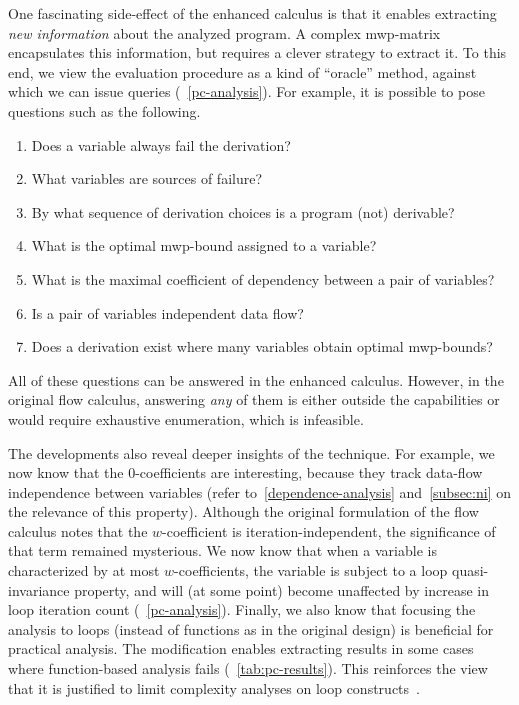 One fascinating side-effect of the enhanced calculus is that it enables extracting \emph{new information} about the analyzed program.
A complex mwp-matrix encapsulates this information, but requires a clever strategy to extract it.
To this end, we view the evaluation procedure as a kind of \enquote{oracle} method, against which we can issue queries (\cf~\autoref{pc-analysis}).
For example, it is possible to pose questions such as the following.
\begin{enumerate}
\item Does a variable always fail the derivation?
\item What variables are sources of failure?
\item By what sequence of derivation choices is a program (not) derivable?
\item What is the optimal mwp-bound assigned to a variable?
\item What is the maximal coefficient of dependency between a pair of variables?
\item Is a pair of variables independent \wrt data flow?
\item Does a derivation exist where many variables obtain optimal mwp-bounds?
\end{enumerate}
All of these questions can be answered in the enhanced calculus.
However, in the original flow calculus, answering \emph{any} of them is either outside the capabilities or would require exhaustive enumeration, which is infeasible.

The developments also reveal deeper insights of the technique.
For example, we now know that the \(0\)-coefficients are interesting, because they track data-flow independence between variables
(refer to~\autoref{dependence-analysis} and~\autoref{subsec:ni} on the relevance of this property).
Although the original formulation of the flow calculus notes that the \(w\)-coefficient is iteration-independent, the significance of that term remained mysterious.
We now know that when a variable is characterized by at most \(w\)-coefficients, the variable is subject to a loop
quasi-invariance property, and will (at some point) become unaffected by increase in loop iteration count (\cf~\autoref{pc-analysis}).
Finally, we also know that focusing the analysis to loops (instead of functions as in the original design) is beneficial for practical analysis.
The modification enables extracting results in some cases where function-based analysis fails (\cf~\autoref{tab:pc-results}).
This reinforces the view that it is justified to limit complexity analyses on loop constructs~\cite{benamram2020}.

